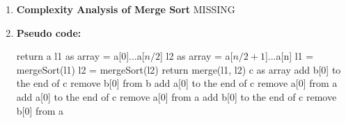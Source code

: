 \documentclass[11pt,a4paper]{article}
\begin{document}
{\begin{enumerate}[label=\textbf{\arabic*})]
					Merge Sort is a Divide and Conquer algorithm. It divides the input array into two halves, calls itself for the two halves, and then it merges the two sorted halves. The merge() function is used for merging two halves. The merge(arr, l, m, r) is a key process that assumes that arr[l..m] and arr[m+1..r] are sorted and merges the two sorted sub-arrays into one
				\\[12pt]
				\item \textbf{Complexity Analysis of Merge Sort}
					MISSING
				\\[12pt]
				\item \textbf{Pseudo code:} 
				\begin{algorithm}
            	\begin{algorithmic}[1]
            				\State return a
            			\EndIf
            			\State l1 as array = a[0]...a[$n/2$]
            			\State l2 as array = a[$n/2+1$]...a[n]
            			\State l1 = mergeSort(l1)
            			\State l2 = mergeSort(l2)
            			\State return merge(l1, l2)
            		\EndProcedure
            		\vspace{12pt}
            			\State c as array
            					\State add b[0] to the end of c
            					\State remove b[0] from b
            				\Else 
            					\State add a[0] to the end of c
            					\State remove a[0] from a
            				\EndIf
            			\EndWhile
            				\State add a[0] to the end of c
            				\State remove a[0] from a
            			\EndWhile
            				\State add b[0] to the end of c
            				\State remove b[0] from a
            			\EndWhile
            			

\end{algorithmic}
\end{algorithm}
\end{enumerate}}
\end{document}
